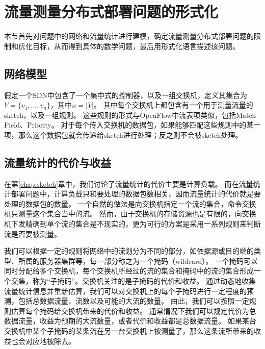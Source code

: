 

\section{流量测量分布式部署问题的形式化}

本节首先对问题中的网络和流量统计进行建模，确定流量测量分布式部署问题的限制和优化目标，从而得到具体的数学问题，最后用形式化语言描述该问题。

\subsection{网络模型}
假定一个SDN中包含了一个集中式的控制器，以及一组交换机，定义其集合为$V=\{v_1, ..., v_n\} $，其中$ n = |V| $。
其中每个交换机上都包含有一个用于测量流量的sketch，以及一组规则。
这些规则的形式与OpenFlow\cite{pfaff2012openflow}中流表项类似，包括Match Field、Priority。
对于每个传入交换机的数据包，如果能够匹配这些规则中的某一项，那么这个数据包就会传递给sketch进行处理；反之则不会被sketch处理。

\subsection{流量统计的代价与收益}
在第\ref{chap:sketch}章中，我们讨论了流量统计的代价主要是计算负载。
而在流量统计部署问题中，计算负载只和要处理的数据包数相关，因而流量统计的代价就是要处理的数据包的数量。
一个自然的做法是向交换机指定一个流的集合，命令交换机只测量这个集合当中的流。
然而，由于交换机的存储资源也是有限的，向交换机下发精确到单个流的集合是不现实的，更为可行的方案是采用一系列规则来判断流是否要被测量。

我们可以根据一定的规则将网络中的流划分为不同的部分，如依据源或目的端的类型、所属的服务器集群等，每一部分称之为一个掩码（wildcard）\cite{xu2017miniming}。
一个掩码可以同时分配给多个交换机，每个交换机所经过的流的集合和掩码中的流的集合形成一个交集，称为“子掩码”。交换机关注的是子掩码的代价和收益。
通过动态地收集流量统计信息并重新估算，我们可以对交换机上的每个子掩码进行一定程度的预测，包括总数据流量、流数以及可能的大流的数量。
由此，我们可以按照一定规则估算每个掩码给交换机带来的代价和收益。
通常情况下我们可以规定代价为总数据流量，收益为预期的大流数量，或者代价和收益都是总数据流量。
如果某台交换机中某个子掩码的某条流在另一台交换机上被测量了，那么这条流所带来的收益也会对应地被除去。

